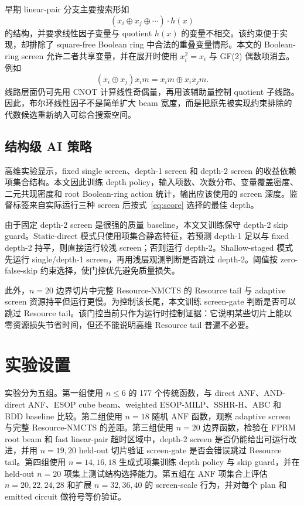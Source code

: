 \documentclass[UTF8,fontset=macnew,11pt]{ctexart}
\newcommand{\method}{Resource-NMCTS}
\newcommand{\screen}{Boolean-ring screen}
\newcommand{\anf}{\ensuremath{\mathrm{ANF}}}
\newcommand{\xor}{\ensuremath{\oplus}}
\begin{document}
早期 linear-pair 分支主要搜索形如
\begin{equation}
  (x_i\xor x_j\xor\cdots)\cdot h(x)
  \label{eq:linear-factor}
\end{equation}
的结构，并要求线性因子变量与 quotient $h(x)$ 的变量不相交。该约束便于实现，却排除了 square-free Boolean ring 中合法的重叠变量情形。本文的 \screen{} 允许二者共享变量，并在展开时使用 $x_i^2=x_i$ 与 GF(2) 偶数项消去。例如
\begin{equation}
  (x_i\xor x_j)x_i m = x_i m \xor x_i x_j m .
  \label{eq:boolean-ring}
\end{equation}
线路层面仍可先用 CNOT 计算线性奇偶量，再用该辅助量控制 quotient 子线路。因此，布尔环线性因子不是简单扩大 beam 宽度，而是把原先被实现约束排除的代数候选重新纳入可综合搜索空间。

\subsection{结构级 AI 策略}

高维实验显示，fixed single screen、depth-1 screen 和 depth-2 screen 的收益依赖项集合结构。本文因此训练 depth policy，输入项数、次数分布、变量覆盖密度、二元共现密度和 root Boolean-ring action 统计，输出应该使用的 screen 深度。监督标签来自实际运行三种 screen 后按式~\eqref{eq:score} 选择的最佳 depth。

由于固定 depth-2 screen 是很强的质量 baseline，本文又训练保守 depth-2 skip guard。Static-direct 模式只使用项集合静态特征，若预测 depth-1 足以与 fixed depth-2 持平，则直接运行较浅 screen；否则运行 depth-2。Shallow-staged 模式先运行 single/depth-1 screen，再用浅层观测判断是否跳过 depth-2。阈值按 zero-false-skip 约束选择，使门控优先避免质量损失。

此外，$n=20$ 边界切片中完整 \method{} 的 Resource tail 与 adaptive screen 资源持平但运行更慢。为控制该长尾，本文训练 screen-gate 判断是否可以跳过 Resource tail。该门控当前只作为运行时控制证据：它说明某些切片上能以零资源损失节省时间，但还不能说明高维 Resource tail 普遍不必要。

\section{实验设置}

实验分为五组。第一组使用 $n\leq6$ 的 177 个传统函数，与 direct ANF、AND-direct ANF、ESOP cube beam、weighted ESOP-MILP、SSHR-H、ABC 和 BDD baseline 比较。第二组使用 $n=18$ 随机 \anf{} 函数，观察 adaptive screen 与完整 \method{} 的差距。第三组使用 $n=20$ 边界函数，检验在 FPRM root beam 和 fast linear-pair 超时区域中，depth-2 screen 是否仍能给出可运行改进，并用 $n=19,20$ held-out 切片验证 screen-gate 是否会错误跳过 Resource tail。第四组使用 $n=14,16,18$ 生成式项集训练 depth policy 与 skip guard，并在 held-out $n=20$ 项集上测试结构选择能力。第五组在 \anf{} 项集合上评估 $n=20,22,24,28$ 和扩展 $n=32,36,40$ 的 screen-scale 行为，并对每个 plan 和 emitted circuit 做符号等价验证。
\end{document}
